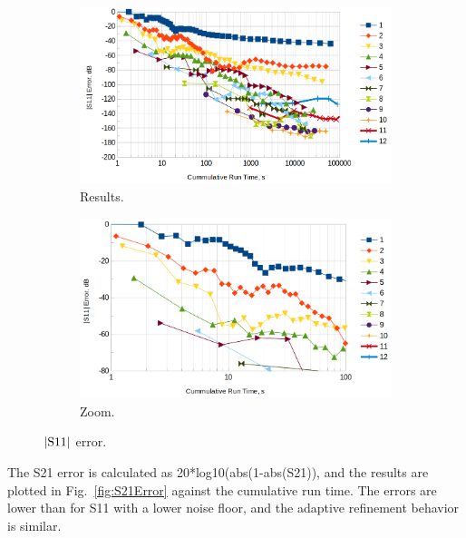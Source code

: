 \documentclass[titlepage]{article}
\renewcommand\_{\textunderscore\linebreak[1]}
\begin{document}
\begin{figure}[H]
  \centering
  \begin{subfigure}[t]{0.49\textwidth}
     \includegraphics[width=1\linewidth]{../regression/OpenParEM3D/WR90/straight_study/screenshots/S11Error}
     \caption{Results.}
  \end{subfigure}
  \begin{subfigure}[t]{0.49\textwidth}
     \includegraphics[width=1\linewidth]{../regression/OpenParEM3D/WR90/straight_study/screenshots/S11ErrorZoom}
     \caption{Zoom.}
  \end{subfigure}
  \caption{$|\textnormal{S11}|$ error.}
  \label{fig:S11Error}
\end{figure}

The S21 error is calculated as 20*log10(abs(1-abs(S21)), and the results are plotted in Fig.~\ref{fig:S21Error} against the cumulative run time.  The errors are lower than for S11 with a lower noise floor, and the adaptive refinement behavior is similar.
\end{document}
